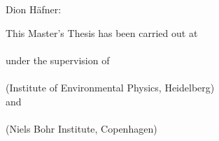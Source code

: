 
\vspace*{\fill}

Dion Häfner: 

\vspace{2ex}

\noindent This Master's Thesis has been carried out at\\[.8em]
\\[.8em]
under the supervision of\\[.8em]
\\ (Institute of Environmental Physics, Heidelberg)\\[.8em]
and\\[.8em]
\\ (Niels Bohr Institute, Copenhagen)

\vspace{3em}

{\color{largeornament}}

\cleardoublepage